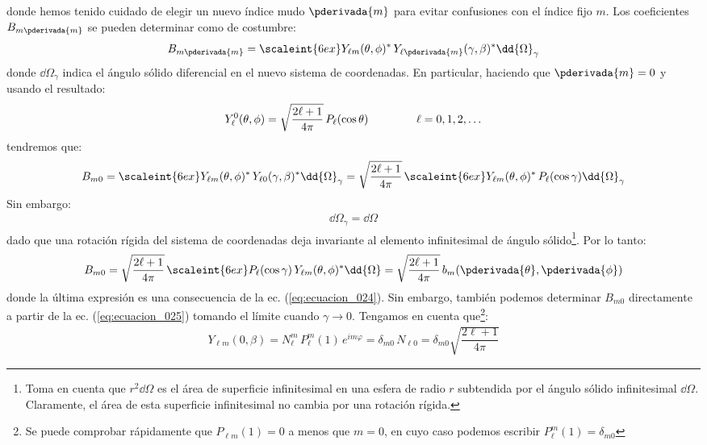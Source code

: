donde hemos tenido cuidado de elegir un nuevo índice mudo $\pderivada{m}$ para evitar confusiones con el índice fijo $m$. Los coeficientes $B_{m \pderivada{m}}$ se pueden determinar como de costumbre:
\begin{align*}
B_{m \pderivada{m}} = \scaleint{6ex} Y_{\ell m} (\theta, \phi)^{*} \, Y_{\ell \pderivada{m}} (\gamma, \beta)^{*} \dd{\Omega}_{\gamma}
\end{align*}
donde $\dd{\Omega}_{\gamma}$ indica el ángulo sólido diferencial en el nuevo sistema de coordenadas. En particular, haciendo que $\pderivada{m} = 0$ y usando el resultado:
\begin{align}
Y_{\ell}^{0} (\theta, \phi) = \sqrt{\dfrac{2 \ell + 1}{4 \pi}} \, P_{\ell} (\cos \theta) \hspace{1.5cm} \ell = 0, 1, 2, \ldots
\label{eq:ecuacion_013}
\end{align}
tendremos que:
\begin{align*}
B_{m 0} = \scaleint{6ex} Y_{\ell m} (\theta, \phi)^{*} \, Y_{\ell 0} (\gamma, \beta)^{*} \dd{\Omega}_{\gamma} = \sqrt{\dfrac{2 \ell + 1}{4 \pi}} \, \scaleint{6ex} Y_{\ell m} (\theta, \phi)^{*} \, P_{\ell} (\cos \gamma) \dd{\Omega}_{\gamma}
\end{align*}
Sin embargo:
\begin{align}
\dd{\Omega}_{\gamma} = \dd{\Omega}
\label{eq:ecuacion_026}
\end{align}
dado que una rotación rígida del sistema de coordenadas deja invariante al elemento infinitesimal de ángulo sólido\footnote{Toma en cuenta que $r^{2} \dd{\Omega}$ es el área de superficie infinitesimal en una esfera de radio $r$ subtendida por el ángulo sólido infinitesimal $\dd{\Omega}$. Claramente, el área de esta superficie infinitesimal no cambia por una rotación rígida.}. Por lo tanto:
\begin{align}
B_{m 0} = \sqrt{\dfrac{2 \ell + 1}{4 \pi}} \, \scaleint{6ex} P_{\ell} (\cos \gamma) \, Y_{\ell m} (\theta, \phi)^{*} \dd{\Omega} = \sqrt{\dfrac{2 \ell + 1}{4 \pi}} \, b_{m} (\pderivada{\theta}, \pderivada{\phi})
\label{eq:ecuacion_027}
\end{align}
donde la última expresión es una consecuencia de la ec. (\ref{eq:ecuacion_024}). Sin embargo, también podemos determinar $B_{m0}$ directamente a partir de la ec. (\ref{eq:ecuacion_025}) tomando el límite cuando $\gamma \to 0$. Tengamos en cuenta que\footnote{Se puede comprobar rápidamente que $P_{\ell m} (1) = 0$ a menos que $m = 0$, en cuyo caso podemos escribir $P_{\ell}^{m} (1) = \delta_{m 0}$}:
\begin{align*}
Y_{\ell m} (0, \beta) = N_{\ell}^{m} \, P_{\ell}^{m} (1) \, e^{i  m \varphi} = \delta_{m 0} \, N_{\ell 0} = \delta_{m 0} \sqrt{\dfrac{2 \ell + 1}{4 \pi}}
\end{align*}
